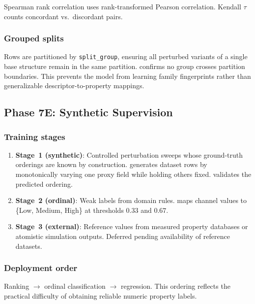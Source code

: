 \documentclass[11pt]{article}
\begin{document}
Spearman rank correlation uses rank-transformed Pearson correlation.
Kendall $\tau$ counts concordant vs.\ discordant pairs.

\subsubsection{Grouped splits}

Rows are partitioned by \texttt{split\_group}, ensuring all perturbed
variants of a single base structure remain in the same partition.
 confirms no group crosses partition
boundaries.  This prevents the model from learning family fingerprints
rather than generalizable descriptor-to-property mappings.

\subsection{Phase 7E: Synthetic Supervision}

\subsubsection{Training stages}

\begin{enumerate}
  \item \textbf{Stage~1 (synthetic)}: Controlled perturbation sweeps
    whose ground-truth orderings are known by construction.
     generates dataset rows by
    monotonically varying one proxy field while holding others fixed.
     validates the predicted ordering.
  \item \textbf{Stage~2 (ordinal)}: Weak labels from domain rules.
     maps channel values to
    \{Low, Medium, High\} at thresholds $0.33$ and $0.67$.
  \item \textbf{Stage~3 (external)}: Reference values from measured
    property databases or atomistic simulation outputs.  Deferred
    pending availability of reference datasets.
\end{enumerate}

\subsubsection{Deployment order}

Ranking $\to$ ordinal classification $\to$ regression.  This ordering
reflects the practical difficulty of obtaining reliable numeric property
labels.
\end{document}
